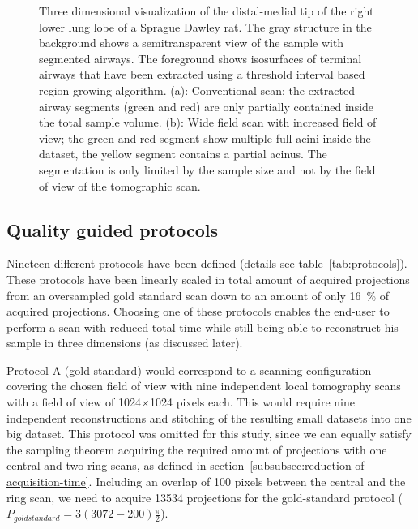 \begin{figure}[htp]
{%
		}%
		\caption{Three dimensional visualization of the distal-medial tip of the right lower lung lobe of a Sprague Dawley rat. The gray structure in the background shows a semitransparent view of the sample with segmented airways. The foreground shows isosurfaces of terminal airways that have been extracted using a threshold interval based region growing algorithm. (a): Conventional scan; the extracted airway segments (green and red) are only partially contained inside the total sample volume. (b): Wide field scan with increased field of view; the green and red segment show multiple full acini inside the dataset, the yellow segment contains a partial acinus. The segmentation is only limited by the sample size and not by the field of view of the tomographic scan.}%
		\label{fig:s2-wfs}%
	\end{figure}
\fi

\subsection{Quality guided protocols}\label{subsec:quality-guided-protocols}%
Nineteen different protocols have been defined (details see table~\ref{tab:protocols}). These protocols have been linearly scaled in total amount of acquired projections from an oversampled gold standard scan down to an amount of only \SI{16}{\percent} of acquired projections. Choosing one of these protocols enables the end-user to perform a scan with reduced total time while still being able to reconstruct his sample in three dimensions (as discussed later).

Protocol A (gold standard) would correspond to a scanning configuration covering the chosen field of view with nine independent local tomography scans with a field of view of 1024$\times$1024 pixels each. This would require nine independent reconstructions and stitching of the resulting small datasets into one big dataset. This protocol was omitted for this study, since we can equally satisfy the sampling theorem acquiring the required amount of projections with one central and two ring scans, as defined in section~\ref{subsubsec:reduction-of-acquisition-time}. Including an overlap of 100 pixels between the central and the ring scan, we need to acquire 13534 projections for the gold-standard protocol ($P_{goldstandard}=3(3072-200)\frac{\pi}{2}$).

